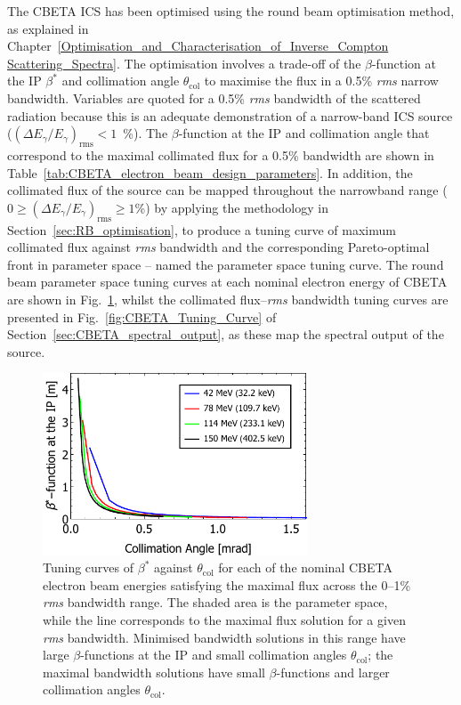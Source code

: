 \documentclass[../main.tex]{subfiles}
\begin{document}
The CBETA ICS has been optimised using the round beam optimisation method, as explained in Chapter~\ref{Optimisation_and_Characterisation_of_Inverse_Compton Scattering_Spectra}. The optimisation involves a trade-off of the $\beta$-function at the IP $\beta^{*}$ and collimation angle $\theta_{\mathrm{col}}$ to maximise the flux in a 0.5\% \textit{rms} narrow bandwidth. Variables are quoted for a 0.5\% \textit{rms} bandwidth of the scattered radiation because this is an adequate demonstration of a narrow-band ICS source ($\left(\Delta E_{\gamma}/E_{\gamma}\right)_{\mathrm{rms}} < 1$~\%). The $\beta$-function at the IP and collimation angle that correspond to the maximal collimated flux for a 0.5\% bandwidth are shown in Table~\ref{tab:CBETA_electron_beam_design_parameters}. In addition, the collimated flux of the source can be mapped throughout the narrowband range ($0 \geq \left(\Delta E_{\gamma}/E_{\gamma}\right)_{\mathrm{rms}} \geq 1$\%) by applying the methodology in Section~\ref{sec:RB_optimisation}, to produce a tuning curve of maximum collimated flux against \textit{rms} bandwidth and the corresponding  Pareto-optimal front in parameter space -- named the parameter space tuning curve. The round beam parameter space tuning curves at each nominal electron energy of CBETA are shown in Fig.~\ref{fig:CBETA_beta_theta_parameter_space}, whilst the collimated flux--\textit{rms} bandwidth tuning curves are presented in Fig.~\ref{fig:CBETA_Tuning_Curve} of Section~\ref{sec:CBETA_spectral_output}, as these map the spectral output of the source. 
\begin{figure}[!h]
\centering
\includegraphics[width=0.7\textwidth]{Figures/CBETA_Inverse_Compton_Source_Design/CBETA_COMBINED_beta_theta.pdf}
\caption{Tuning curves of $\beta^{*}$ against $\theta_{\mathrm{col}}$ for each of the nominal CBETA electron beam energies satisfying the maximal flux across the 0--1\% \textit{rms} bandwidth range. The shaded area is the parameter space, while the line corresponds to the maximal flux solution for a given \textit{rms} bandwidth. Minimised bandwidth solutions in this range have large $\beta$-functions at the IP and small collimation angles $\theta_{\mathrm{col}}$; the maximal bandwidth solutions have small $\beta$-functions and larger collimation angles $\theta_{\mathrm{col}}$.}
\label{fig:CBETA_beta_theta_parameter_space}
\end{figure}
\end{document}
